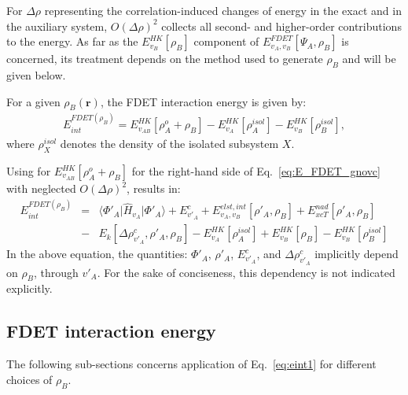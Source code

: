 \documentclass[amsmath,amssymb,preprint,aip,jcp]{revtex4-1}
\newcommand{\nr}[1]{\color{red}#1\color{black}}
\begin{document}
For $\Delta\rho$  representing the correlation-induced changes of energy in the exact and in the auxiliary system, 
 $O(\Delta\rho)^2$ collects all second- and higher\nr{-}order contributions to the energy. 
As far as the $E^{HK}_{v_B}[\rho_B]$ component of ${ E}_{v_A,v_B}^{FDET}[\Psi_{A},\rho_B]$ is concerned,
its treatment depends on the method used to generate $\rho_B$ and will be given below.


For a given $\rho_B(\mathbf{r})$,
the FDET interaction energy is given by:
\begin{eqnarray}
E_{int}^{FDET(\rho_B)}=E_{v_{AB}}^{HK}[\rho_A^{o}+\rho_B] - E_{v_A}^{HK}[\rho_A^{isol}] - 
E_{v_B}^{HK}[\rho_B^{isol}],     \label{eq:eint0}
\end{eqnarray}
\nr{where $\rho_X^{isol}$ denotes the density of the isolated subsystem $X$.}

Using for  $E_{v_{AB}}^{HK}[\rho_A^{o}+\rho_B]$ for the right-hand side of Eq.~\ref{eq:E_FDET_gnovc} with  neglected $O(\Delta\rho)^2$, results in:
\begin{eqnarray}
E_{int}^{FDET(\rho_B)}&=&
\langle\Phi'_{A}\vert \hat{H}_{v_A}\vert \Phi'_{A}\rangle + E^{c}_{v'_A}
+ E^{elst,int}_{v_A,v_B}[\rho'_A,\rho_B] + {E}_{xcT}^{nad}[\rho'_A,\rho_B] \label{eq:eint1}\\
&-&     E_k[\Delta \rho^{c}_{v'_A}, \rho'_A, \rho_B]  - E_{v_A}^{HK}[\rho_A^{isol}] + {E}^{HK}_{v_B}[\rho_B]  - 
E_{v_B}^{HK}[\rho_B^{isol}] \nonumber
\end{eqnarray}
In the above equation,  the quantities:  $\Phi'_{A}$, $\rho'_A$, $E^{c}_{v'_A}$, and $\Delta \rho^{c}_{v'_A}$ \nr{implicitly } depend on $\rho_B$\nr{, through  $v'_A$. For the sake of conciseness}, this dependency is not indicated explicitly. 
\subsection{FDET interaction energy}
The \nr{following } sub-sections concerns application of Eq.~\ref{eq:eint1} for different choices \nr{of } $\rho_B$. 
\end{document}
